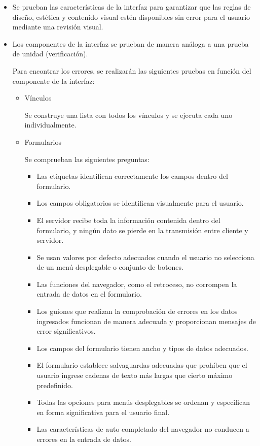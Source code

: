 \begin{itemize}
\item Se prueban las características de la interfaz para garantizar que las reglas de diseño, estética y contenido visual estén disponibles sin error para el usuario mediante una revisión visual.
\item Los componentes de la interfaz se prueban de manera análoga a una prueba de unidad (verificación).



Para encontrar los errores, se realizarán las siguientes pruebas en función del componente de la interfaz:


\begin{itemize}
\item Vínculos



Se construye una lista con todos los vínculos y se ejecuta cada uno individualmente.



\item Formularios



Se comprueban las siguientes preguntas:


\begin{itemize}

\item Las etiquetas identifican correctamente los campos dentro del formulario.
\item Los campos obligatorios se identifican visualmente para el usuario. 
\item El servidor recibe toda la información contenida dentro del formulario, y ningún dato se pierde en la transmisión entre cliente y servidor. 
\item Se usan valores por defecto adecuados cuando el usuario no selecciona de un menú desplegable o conjunto de botones. 
\item Las funciones del navegador, como el retroceso, no corrompen la entrada de datos en el formulario. 
\item Los guiones que realizan la comprobación de errores en los datos ingresados funcionan de manera adecuada y proporcionan mensajes de error significativos. 
\item Los campos del formulario tienen ancho y tipos de datos adecuados. 
\item El formulario establece salvaguardas adecuadas que prohíben que el usuario ingrese cadenas de texto más largas que cierto máximo predefinido. 
\item Todas las opciones para menús desplegables se ordenan y especifican en forma significativa para el usuario final. 
\item Las características de auto completado del navegador no conducen a errores en la entrada de datos. 
\end{itemize}


\end{itemize}
\end{itemize}
